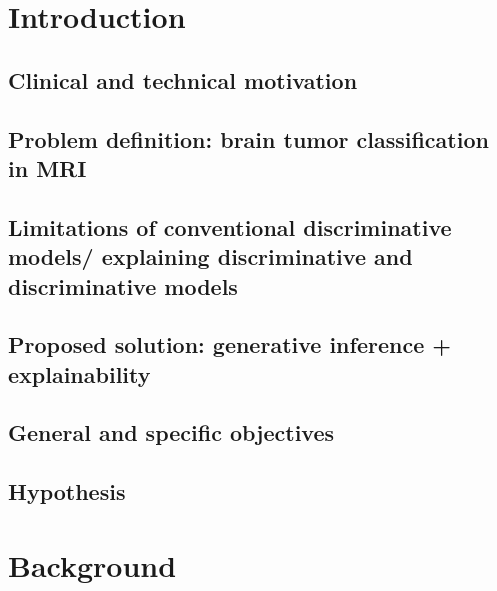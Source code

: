 %
%

\chapter{Introduction}

\section{Clinical and technical motivation}
\section{Problem definition: brain tumor classification in MRI}
\section{Limitations of conventional discriminative models/ explaining discriminative and discriminative models}
\section{Proposed solution: generative inference + explainability}
\section{General and specific objectives}
\section{Hypothesis}


\chapter{Background}

